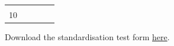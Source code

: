 \documentclass[12pt,a4paper]{book}
\theoremstyle{definition}
\theoremstyle{definition}
\theoremstyle{definition}
\theoremstyle{remark}
\let\BeginKnitrBlock\begin \let\EndKnitrBlock\end
\begin{document}
\begin{longtable}[]{@{}lllll@{}}
\begin{minipage}[t]{0.17\columnwidth}
\strut
\end{minipage}\tabularnewline
\begin{minipage}[t]{0.17\columnwidth}\raggedright
10\strut
\end{minipage} & \begin{minipage}[t]{0.17\columnwidth}\raggedright
\strut
\end{minipage} & \begin{minipage}[t]{0.17\columnwidth}\raggedright
\strut
\end{minipage} & \begin{minipage}[t]{0.17\columnwidth}\raggedright
\strut
\end{minipage} & \begin{minipage}[t]{0.17\columnwidth}\raggedright
\strut
\end{minipage}\tabularnewline
\bottomrule
\end{longtable}

\BeginKnitrBlock{rmddownload}
Download the standardisation test form
\href{forms/standardForm.pdf}{here}.
\EndKnitrBlock{rmddownload}
\end{document}
